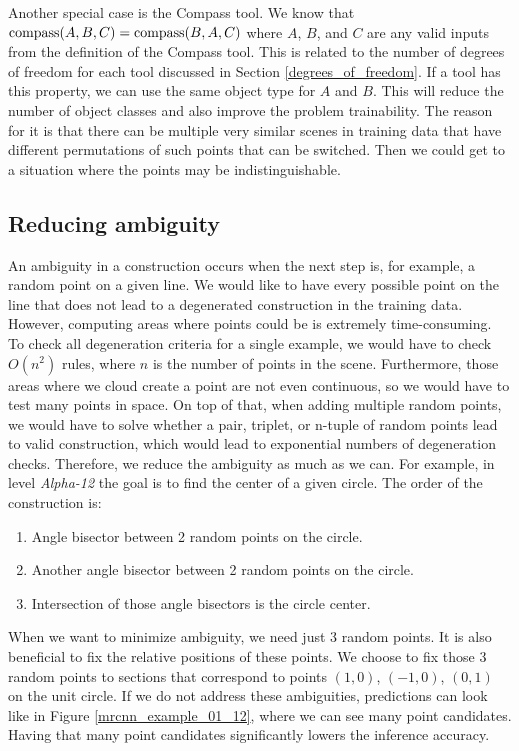 \newline \newline
Another special case is the Compass tool. We know that $\operatorname{compass}(A, B, C) = \operatorname{compass}(B, A, C)$ where $A$, $B$, and $C$ are any valid inputs from the definition of the Compass tool. This is related to the number of degrees of freedom for each tool discussed in Section \ref{degrees_of_freedom}. If a tool has this property, we can use the same object type for $A$ and $B$. This will reduce the number of object classes and also improve the problem trainability. The reason for it is that there can be multiple very similar scenes in training data that have different permutations of such points that can be switched. Then we could get to a situation where the points may be indistinguishable.


\subsection{Reducing ambiguity}
An ambiguity in a construction occurs when the next step is, for example, a random point on a given line. We would like to have every possible point on the line that does not lead to a degenerated construction in the training data. However, computing areas where points could be is extremely time-consuming. To check all degeneration criteria for a single example, we would have to check {$O(n^2)$} rules, where $n$ is the number of points in the scene. Furthermore, those areas where we cloud create a point are not even continuous, so we would have to test many points in space. On top of that, when adding multiple random points, we would have to solve whether a pair, triplet, or n-tuple of random points lead to valid construction, which would lead to exponential numbers of degeneration checks.
\newline \newline
Therefore, we reduce the ambiguity as much as we can. For example, in level \textit{Alpha-12} the goal is to find the center of a given circle. The order of the construction is:
\begin{enumerate}
  \item Angle bisector between 2 random points on the circle.
  \item Another angle bisector between 2 random points on the circle.
  \item Intersection of those angle bisectors is the circle center.
\end{enumerate}
When we want to minimize ambiguity, we need just 3 random points. It is also beneficial to fix the relative positions of these points.  We choose to fix those 3 random points to sections that correspond to points {$(1,0)$, $(-1,0)$, $(0,1)$} on the unit circle. If we do not address these ambiguities, predictions can look like in Figure \ref{mrcnn_example_01_12}, where we can see many point candidates. Having that many point candidates significantly lowers the inference accuracy.  
